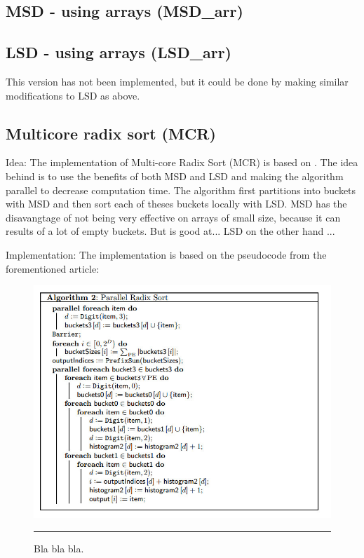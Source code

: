 \subsection{MSD - using arrays (MSD\_arr)}


\subsection{LSD - using arrays (LSD\_arr)}
This version has not been implemented, but it could be done by making similar modifications to LSD as above.


\subsection{Multicore radix sort (MCR) \citep{radixSort}}
Idea:
The implementation of Multi-core Radix Sort (MCR) is based on \citep{radixSort}. The idea behind is to use the benefits of both MSD and LSD and making the algorithm parallel to decrease computation time. 
The algorithm first partitions into buckets with MSD and then sort each of theses buckets locally with LSD.  
MSD has the disavangtage of not being very effective on arrays of small size, because it can results of a lot of empty buckets. But is good at...
LSD on the other hand ...


Implementation:
The implementation is based on the pseudocode from the forementioned article:
\begin{figure}[htbp]
	\centering
		\includegraphics[width=\textwidth]{./Figures/Project2b/MultiCoreRadix_Pseudo.jpg}
		\rule{35em}{0.5pt}
	\caption[Branch misses]{
	Bla bla bla.
	}
	\label{fig:Branch_misses}
\end{figure}

